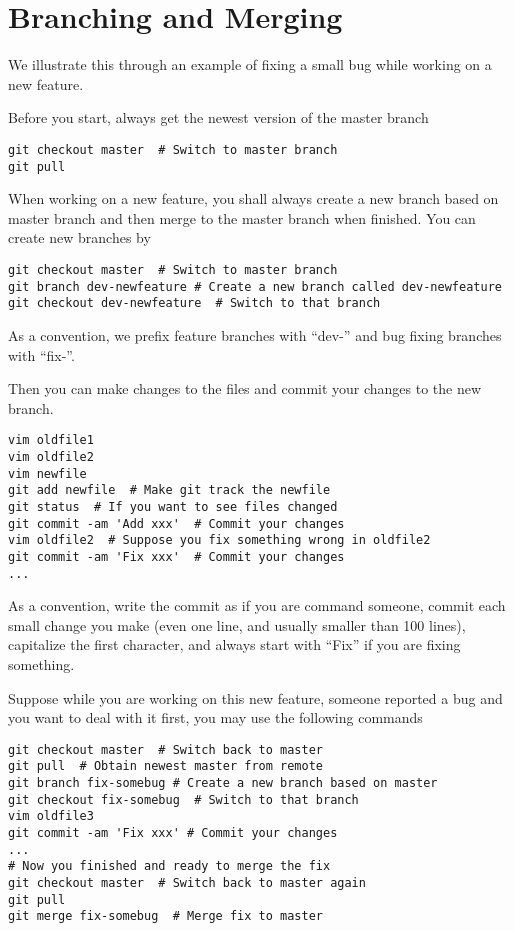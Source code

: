 \documentclass[runningheads,letterpaper]{llncs}
\begin{document}
\section{Branching and Merging}
\label{sec:basic}
We illustrate this through an example of fixing a small bug while working on a new feature.

Before you start, always get the newest version of the master branch
\begin{verbatim}
git checkout master  # Switch to master branch
git pull
\end{verbatim}

When working on a new feature, you shall always create a new branch based on master branch and then merge to the master branch when finished.
You can create new branches by
\begin{verbatim}
git checkout master  # Switch to master branch
git branch dev-newfeature # Create a new branch called dev-newfeature
git checkout dev-newfeature  # Switch to that branch
\end{verbatim}
As a convention, we prefix feature branches with ``dev-'' and bug fixing branches with ``fix-''.

Then you can make changes to the files and commit your changes to the new branch.
\begin{verbatim}
vim oldfile1
vim oldfile2
vim newfile
git add newfile  # Make git track the newfile
git status  # If you want to see files changed
git commit -am 'Add xxx'  # Commit your changes
vim oldfile2  # Suppose you fix something wrong in oldfile2
git commit -am 'Fix xxx'  # Commit your changes
...
\end{verbatim}
As a convention,
write the commit as if you are command someone,
commit each small change you make (even one line, and usually smaller than 100 lines),
capitalize the first character,
and always start with ``Fix'' if you are fixing something.

Suppose while you are working on this new feature, someone reported a bug and you want to deal with it first, you may use the following commands
\begin{verbatim}
git checkout master  # Switch back to master
git pull  # Obtain newest master from remote
git branch fix-somebug # Create a new branch based on master
git checkout fix-somebug  # Switch to that branch
vim oldfile3
git commit -am 'Fix xxx' # Commit your changes
...
# Now you finished and ready to merge the fix
git checkout master  # Switch back to master again
git pull
git merge fix-somebug  # Merge fix to master
\end{verbatim}
\end{document}
